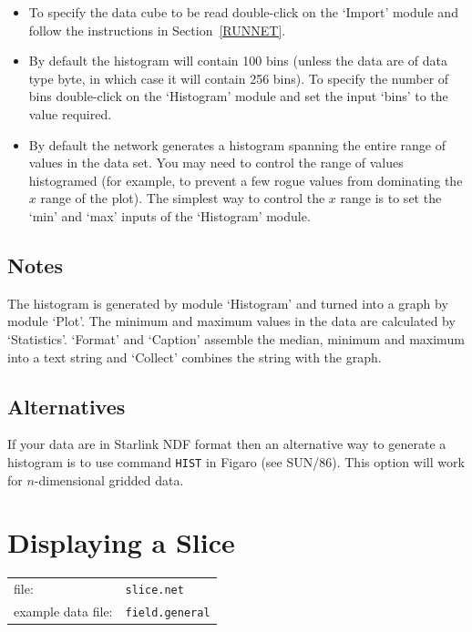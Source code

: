 \documentclass[twoside,11pt]{article}
\newcommand{\xref}[3]{#1}
\newcommand{\xlabel}[1]{}
\begin{document}
\begin{itemize}

  \item To specify the data cube to be read double-click on the `Import'
   module and follow the instructions in Section~\ref{RUNNET}.

  \item By default the histogram will contain 100 bins (unless the data
   are of data type byte, in which case it will contain 256 bins). To
   specify the number of bins double-click on the `Histogram' module
   and set the input `bins' to the value required.

  \item By default the network generates a histogram spanning the
   entire range of values in the data set. You may need to control
   the range of values histogramed (for example, to prevent a few
   rogue values from dominating the $x$ range of the plot). The
   simplest way to control the $x$ range is to set the `min' and `max'
   inputs of the `Histogram' module.

\end{itemize}

\subsection{Notes}

The histogram is generated by module `Histogram' and turned into a graph
by module `Plot'. The minimum and maximum values in the data are
calculated by `Statistics'. `Format' and `Caption' assemble the median,
minimum and maximum into a text string and `Collect' combines the string
with the graph.

\subsection{Alternatives}

If your data are in Starlink NDF format then an alternative way to
generate a histogram is to use command \xref{{\tt HIST}}{sun86}{HIST} in
Figaro (see \xref{SUN/86}{sun86}{}\cite{SUN86}).  This option will work
for $n$-dimensional gridded data.


\newpage
\section{\xlabel{SLICNET}\label{SLICNET}Displaying a Slice}


\begin{tabular}{ll}
file:              & {\tt slice.net}     \\
example data file: & {\tt field.general} \\
\end{tabular}
\end{document}

